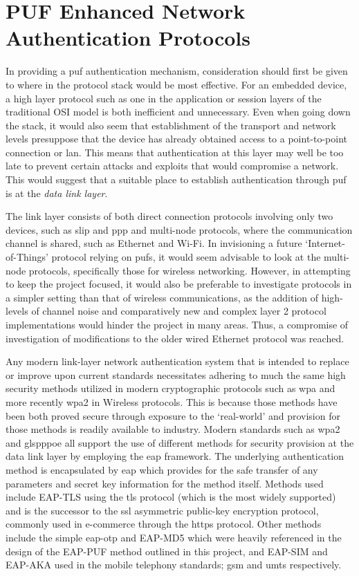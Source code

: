 \section{PUF Enhanced Network Authentication Protocols}

In providing a \gls{puf} authentication mechanism, consideration should first be
given to where in the protocol stack would be most effective.
For an embedded device,
a high layer protocol such as one in the application or session layers
of the traditional OSI model is both inefficient and unnecessary.
Even when going down the stack,
it would also seem that establishment of the transport and network levels
presuppose that the device has already obtained access to a point-to-point
connection or \gls{lan}. This means that authentication at this layer may well be too
late to prevent certain attacks and exploits that would compromise a network.
This would suggest that a suitable place to establish authentication through
\gls{puf} is at the \emph{data link layer}.

The link layer consists of both direct connection protocols involving only two
devices, such as \gls{slip} and \gls{ppp} and multi-node protocols, where the
communication channel is shared, such as Ethernet and Wi-Fi.
In invisioning a
future `Internet-of-Things' protocol relying on \glspl{puf}, it would seem
advisable to look at the multi-node protocols, specifically those for wireless
networking.
However, in attempting to keep the project focused, it would also be preferable to
investigate protocols in a simpler setting than that of wireless communications,
as the addition of high-levels of channel noise and comparatively new and complex
layer 2 protocol implementations would hinder the project in many areas.
Thus, a compromise of investigation of modifications to the older wired Ethernet
protocol was reached.

Any modern link-layer network authentication system that is intended to
replace or improve upon current standards necessitates
adhering to much the same high security methods utilized in modern cryptographic
protocols such as  \gls{wpa} and more recently \gls{wpa2} in Wireless protocols.
This is because those methods have been both proved secure through exposure to
the `real-world' and provision for those methods is readily available to
industry. Modern standards such as \gls{wpa2} and gls{pppoe} all support the use
of different methods for security provision at the data link layer by employing
the \gls{eap} framework. The underlying authentication method is encapsulated
by \gls{eap} which provides for the safe transfer of any parameters and secret
key information for the method itself. Methods used include EAP-TLS using the
\gls{tls} protocol (which is the most widely supported) and is the successor to the
\gls{ssl} asymmetric public-key encryption protocol, commonly used in e-commerce
through the \gls{https} protocol.
Other methods include the simple \gls{eap-otp} and EAP-MD5 which were heavily
referenced in the design of the EAP-PUF method outlined in this project, and
EAP-SIM and EAP-AKA used in the mobile telephony standards; \gls{gsm} and
\gls{umts} respectively.

